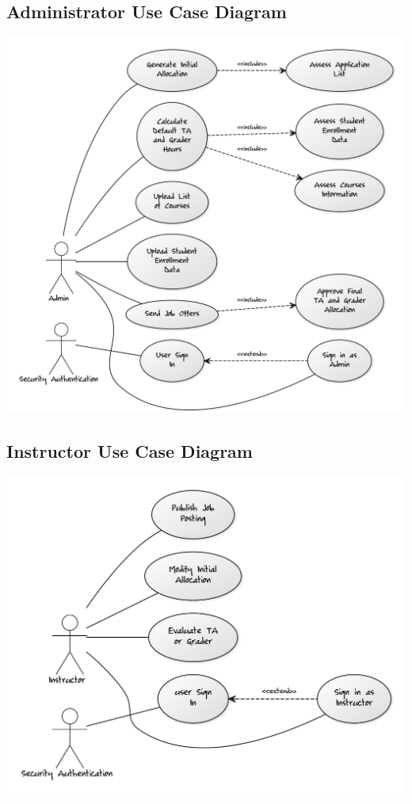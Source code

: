 \documentclass[12pt,openany]{report}
\begin{document}
\subsection{Administrator Use Case Diagram}
\includegraphics[scale=0.45]{model/Diagrams/UC/adminUC}
\subsection{Instructor Use Case Diagram}
\includegraphics[scale=0.5]{model/Diagrams/UC/instructorUC}
\end{document}
